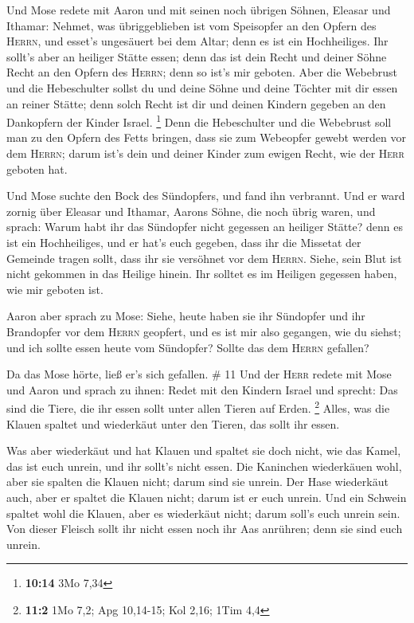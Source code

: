  Und Mose redete mit Aaron und mit seinen noch übrigen
Söhnen, Eleasar und Ithamar: Nehmet, was übriggeblieben ist vom
Speisopfer an den Opfern des \textsc{Herrn}, und esset's ungesäuert bei
dem Altar; denn es ist ein Hochheiliges.  Ihr sollt's
aber an heiliger Stätte essen; denn das ist dein Recht und deiner Söhne
Recht an den Opfern des \textsc{Herrn}; denn so ist's mir geboten.
 Aber die Webebrust und die Hebeschulter sollst du und
deine Söhne und deine Töchter mit dir essen an reiner Stätte; denn solch
Recht ist dir und deinen Kindern gegeben an den Dankopfern der Kinder
Israel. \footnote{\textbf{10:14} 3Mo 7,34}  Denn die
Hebeschulter und die Webebrust soll man zu den Opfern des Fetts bringen,
dass sie zum Webeopfer gewebt werden vor dem \textsc{Herrn}; darum ist's
dein und deiner Kinder zum ewigen Recht, wie der \textsc{Herr} geboten
hat.

 Und Mose suchte den Bock des Sündopfers, und fand ihn
verbrannt. Und er ward zornig über Eleasar und Ithamar, Aarons Söhne,
die noch übrig waren, und sprach:  Warum habt ihr das
Sündopfer nicht gegessen an heiliger Stätte? denn es ist ein
Hochheiliges, und er hat's euch gegeben, dass ihr die Missetat der
Gemeinde tragen sollt, dass ihr sie versöhnet vor dem \textsc{Herrn}.
 Siehe, sein Blut ist nicht gekommen in das Heilige
hinein. Ihr solltet es im Heiligen gegessen haben, wie mir geboten ist.

 Aaron aber sprach zu Mose: Siehe, heute haben sie ihr
Sündopfer und ihr Brandopfer vor dem \textsc{Herrn} geopfert, und es ist
mir also gegangen, wie du siehst; und ich sollte essen heute vom
Sündopfer? Sollte das dem \textsc{Herrn} gefallen?

 Da das Mose hörte, ließ er's sich gefallen. \# 11
 Und der \textsc{Herr} redete mit Mose und Aaron und
sprach zu ihnen:  Redet mit den Kindern Israel und
sprecht: Das sind die Tiere, die ihr essen sollt unter allen Tieren auf
Erden. \footnote{\textbf{11:2} 1Mo 7,2; Apg 10,14-15; Kol 2,16; 1Tim 4,4}
 Alles, was die Klauen spaltet und wiederkäut unter den
Tieren, das sollt ihr essen.

 Was aber wiederkäut und hat Klauen und spaltet sie doch
nicht, wie das Kamel, das ist euch unrein, und ihr sollt's nicht essen.
 Die Kaninchen wiederkäuen wohl, aber sie spalten die
Klauen nicht; darum sind sie unrein.  Der Hase wiederkäut
auch, aber er spaltet die Klauen nicht; darum ist er euch unrein.
 Und ein Schwein spaltet wohl die Klauen, aber es
wiederkäut nicht; darum soll's euch unrein sein.  Von
dieser Fleisch sollt ihr nicht essen noch ihr Aas anrühren; denn sie
sind euch unrein.

